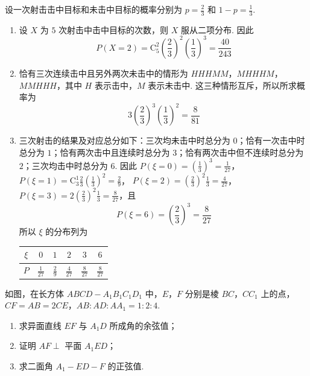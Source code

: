 \begin{solution}
设一次射击击中目标和未击中目标的概率分别为 \(p=\frac{2}{3}\) 和 \(1-p=\frac{1}{3}\).
\begin{enumerate}
\item 设 \(X\) 为 \(5\) 次射击中击中目标的次数，则 \(X\) 服从二项分布. 因此
\[
P(X=2)=\mathrm C_5^2\left(\frac{2}{3}\right)^2\left(\frac{1}{3}\right)^3=\frac{40}{243}
\]
\item 恰有三次连续击中且另外两次未击中的情形为 \(HHHMM\)，\(MHHHM\)，\(MMHHH\)，其中 \(H\) 表示击中，\(M\) 表示未击中. 这三种情形互斥，所以所求概率为
\[
3\left(\frac{2}{3}\right)^3\left(\frac{1}{3}\right)^2=\frac{8}{81}
\]
\item 三次射击的结果及对应总分如下：三次均未击中时总分为 \(0\)；恰有一次击中时总分为 \(1\)；恰有两次击中且连续时总分为 \(3\)；恰有两次击中但不连续时总分为 \(2\)；三次均击中时总分为 \(6\). 因此
\(P(\xi=0)=\left(\frac{1}{3}\right)^3=\frac{1}{27}\)，
\(P(\xi=1)=\mathrm C_3^1\frac{2}{3}\left(\frac{1}{3}\right)^2=\frac{2}{9}\)，
\(P(\xi=2)=\left(\frac{2}{3}\right)^2\frac{1}{3}=\frac{4}{27}\)，
\(P(\xi=3)=2\left(\frac{2}{3}\right)^2\frac{1}{3}=\frac{8}{27}\)，且
\[
P(\xi=6)=\left(\frac{2}{3}\right)^3=\frac{8}{27}
\]
所以 \(\xi\) 的分布列为
\begin{center}
\begin{tabular}{c|ccccc}
\(\xi\) & \(0\) & \(1\) & \(2\) & \(3\) & \(6\) \\
\hline
\(P\) & \(\frac{1}{27}\) & \(\frac{2}{9}\) & \(\frac{4}{27}\) & \(\frac{8}{27}\) & \(\frac{8}{27}\)
\end{tabular}
\end{center}
\end{enumerate}
\end{solution}

\begin{problem}
如图，在长方体 \(ABCD - A_{1}B_{1}C_{1}D_{1}\) 中，\(E\)，\(F\) 分别是棱 \(BC\)，\(CC_{1}\) 上的点，\(CF = AB = 2CE\)，\(AB:AD:AA_{1} = 1:2:4\).
\begin{enumerate}
\item 求异面直线 \(EF\) 与 \(A_{1}D\) 所成角的余弦值；
\item 证明 \(AF \perp\) 平面 \(A_{1}ED\)；
\item 求二面角 \(A_{1} - ED - F\) 的正弦值.
\end{enumerate}

\end{problem}


